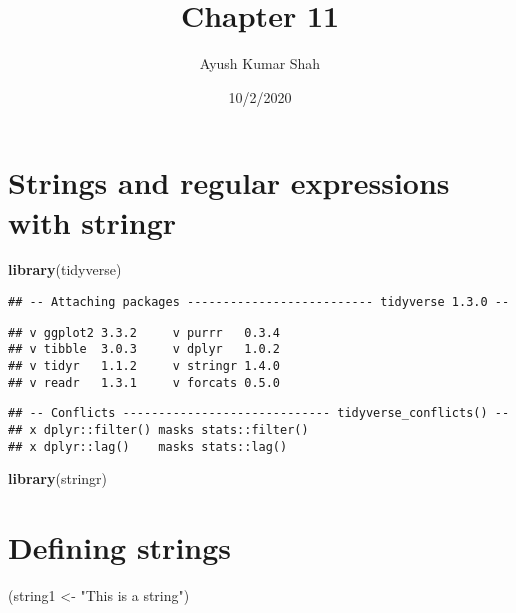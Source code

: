 \documentclass[
]{article}
\title{Chapter 11}
\author{Ayush Kumar Shah}
\date{10/2/2020}
\newenvironment{Shaded}{\begin{snugshade}}{\end{snugshade}}
\newcommand{\KeywordTok}[1]{\textcolor[rgb]{0.13,0.29,0.53}{\textbf{#1}}}
\newcommand{\NormalTok}[1]{#1}
\newcommand{\StringTok}[1]{\textcolor[rgb]{0.31,0.60,0.02}{#1}}
\begin{document}
\maketitle

\hypertarget{strings-and-regular-expressions-with-stringr}{%
\section{Strings and regular expressions with
stringr}\label{strings-and-regular-expressions-with-stringr}}

\begin{Shaded}
\begin{Highlighting}[]
\KeywordTok{library}\NormalTok{(tidyverse)}
\end{Highlighting}
\end{Shaded}

\begin{verbatim}
## -- Attaching packages -------------------------- tidyverse 1.3.0 --
\end{verbatim}

\begin{verbatim}
## v ggplot2 3.3.2     v purrr   0.3.4
## v tibble  3.0.3     v dplyr   1.0.2
## v tidyr   1.1.2     v stringr 1.4.0
## v readr   1.3.1     v forcats 0.5.0
\end{verbatim}

\begin{verbatim}
## -- Conflicts ----------------------------- tidyverse_conflicts() --
## x dplyr::filter() masks stats::filter()
## x dplyr::lag()    masks stats::lag()
\end{verbatim}

\begin{Shaded}
\begin{Highlighting}[]
\KeywordTok{library}\NormalTok{(stringr)}
\end{Highlighting}
\end{Shaded}

\hypertarget{defining-strings}{%
\section{Defining strings}\label{defining-strings}}

\begin{Shaded}
\begin{Highlighting}[]
\NormalTok{(string1 \textless{}{-}}\StringTok{ "This is a string"}\NormalTok{)}
\end{Highlighting}
\end{Shaded}
\end{document}
